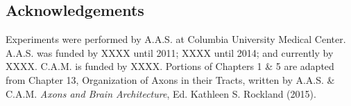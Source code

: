 \subsection*{Acknowledgements}
\label{subsec:acknowledgements}
Experiments were performed by A.A.S. at Columbia University Medical Center. 
A.A.S. was funded by XXXX until 2011; XXXX until 2014; and currently by XXXX.
C.A.M. is funded by XXXX. 
Portions of Chapters 1 \& 5 are adapted from Chapter 13, Organization of Axons in their Tracts, written by A.A.S. \& C.A.M. \emph{Axons and Brain Architecture}, Ed. Kathleen S. Rockland (2015).
